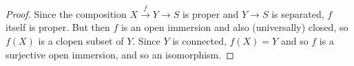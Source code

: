 \begin{proof}
	Since the composition $X \xrightarrow{f} Y \to S$ is proper and $Y \to S$ is separated, $f$ itself is proper. But then $f$ is an open immersion and also (universally) closed, so $f(X)$ is a clopen subset of $Y$. Since $Y$ is connected, $f(X) = Y$ and so $f$ is a surjective open immersion, and so an isomorphism.
\end{proof}
